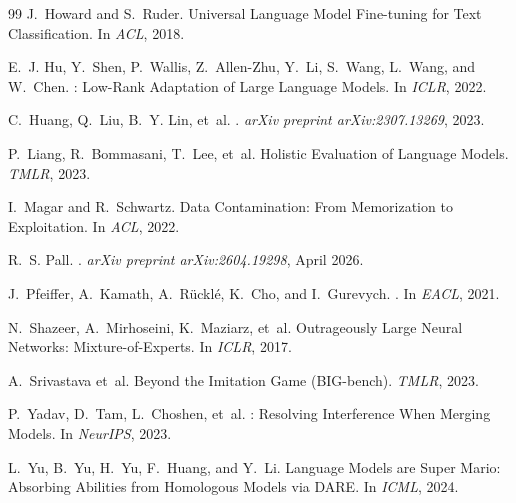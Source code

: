 \documentclass{article}
\begin{document}
\begin{thebibliography}{99}
J.~Howard and S.~Ruder.
\newblock Universal Language Model Fine-tuning for Text Classification.
\newblock In \emph{ACL}, 2018.

E.~J. Hu, Y.~Shen, P.~Wallis, Z.~Allen-Zhu, Y.~Li, S.~Wang, L.~Wang, and W.~Chen.
: Low-Rank Adaptation of Large Language Models.
\newblock In \emph{ICLR}, 2022.

C.~Huang, Q.~Liu, B.~Y. Lin, et~al.
.
\newblock \emph{arXiv preprint arXiv:2307.13269}, 2023.

P.~Liang, R.~Bommasani, T.~Lee, et~al.
\newblock Holistic Evaluation of Language Models.
\newblock \emph{TMLR}, 2023.

I.~Magar and R.~Schwartz.
\newblock Data Contamination: From Memorization to Exploitation.
\newblock In \emph{ACL}, 2022.

R.~S. Pall.
.
\newblock \emph{arXiv preprint arXiv:2604.19298}, April 2026.

J.~Pfeiffer, A.~Kamath, A.~R{\"u}ckl{\'e}, K.~Cho, and I.~Gurevych.
.
\newblock In \emph{EACL}, 2021.

N.~Shazeer, A.~Mirhoseini, K.~Maziarz, et~al.
\newblock Outrageously Large Neural Networks: Mixture-of-Experts.
\newblock In \emph{ICLR}, 2017.

A.~Srivastava et~al.
\newblock Beyond the Imitation Game ({BIG-bench}).
\newblock \emph{TMLR}, 2023.

P.~Yadav, D.~Tam, L.~Choshen, et~al.
: Resolving Interference When Merging Models.
\newblock In \emph{NeurIPS}, 2023.

L.~Yu, B.~Yu, H.~Yu, F.~Huang, and Y.~Li.
\newblock Language Models are Super Mario: Absorbing Abilities from Homologous Models via {DARE}.
\newblock In \emph{ICML}, 2024.

\end{thebibliography}

\appendix
\end{document}
